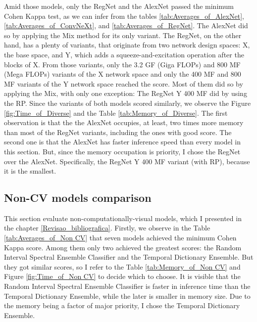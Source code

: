 Amid those models, only the RegNet and the AlexNet passed the minimum Cohen Kappa test, as we can infer from the tables \ref{tab:Averages_of_AlexNet}, \ref{tab:Averages_of_ConvNeXt}, and \ref{tab:Averages_of_RegNet}. The AlexNet did so by applying the \gls{Mix} method for its only variant. The RegNet, on the other hand, has a plenty of variants, that originate from two network design spaces: X, the base space, and Y, which adds a squeeze-and-excitation operation after the blocks of X. From those variants, only the 3.2 GF (Giga FLOPs) and 800 MF (Mega FLOPs) variants of the X network space and only the 400 MF and 800 MF variants of the Y network space reached the score. Most of them did so by applying the \gls{Mix}, with only one exception: The RegNet Y 400 MF did by using the \gls{RP}. Since the variants of both models scored similarly, we observe the Figure \ref{fig:Time_of_Diverse} and the Table \ref{tab:Memory_of_Diverse}. The first observation is that the the AlexNet occupies, at least, two times more memory than most of the RegNet variants, including the ones with good score. The second one is that the AlexNet has faster inference speed than every model in this section. But, since the memory occupation is priority, I chose the RegNet over the AlexNet. Specifically, the RegNet Y 400 MF variant (with \gls{RP}), because it is the smallest.  






\FloatBarrier

\subsection{Non-CV models comparison}

This section evaluate non-computationally-visual models, which I presented in the chapter \ref{Revisao_bibliografica}. Firstly, we observe in the Table \ref{tab:Averages_of_Non CV} that seven models achieved the minimum Cohen Kappa score. Among them only two achieved the greatest scores: the Random Interval Spectral Ensemble Classifier and the Temporal Dictionary Ensemble. But they got similar scores, so I refer to the Table \ref{tab:Memory_of_Non CV} and Figure \ref{fig:Time_of_Non CV} to decide which to choose. It is visible that the Random Interval Spectral Ensemble Classifier is faster in inference time than the Temporal Dictionary Ensemble, while the later is smaller in memory size. Due to the memory being a factor of major priority, I chose the Temporal Dictionary Ensemble. 	 

